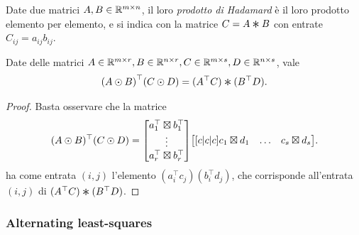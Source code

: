 \begin{definition}
	Date due matrici $ A,B \in \mathbb{R}^{m\times n} $, il loro \emph{prodotto di Hadamard} è il loro
	prodotto elemento per elemento, e si indica con la matrice $ C = A \had B $ con entrate $ C_{ij} =
		a_{ij}b_{ij} $.
\end{definition}
\begin{lemma}
	\label{lhm:had_krp}
	Date delle matrici $ A \in \mathbb{R}^{m\times r}, B \in \mathbb{R}^{n \times r}, C \in \mathbb{R}^{m\times s}, D \in
		\mathbb{R}^{n\times s} $, vale
	\begin{equation*}
		\left( A \krp B \right)^{\top} \left( C \krp D \right) = (
		A^{\top}C ) \had ( B^{\top}D ).
	\end{equation*}
\end{lemma}
\begin{proof}
	Basta osservare che la matrice
	\begin{equation*}
		\begin{aligned}
			(A \krp B)^{\top}(C \krp D) =
			\begin{bmatrix} a_1^{\top} \krn b_1^{\top} \\ \vdots \\
				a_{r}^{\top} \krn b_{r}^{\top}
			\end{bmatrix} \begin{bmatrix}[c|c|c]
				              c_1 \krn d_{1} & \dots & c_{s} \krn d_{s}
			              \end{bmatrix}.
		\end{aligned}
	\end{equation*}
	ha come entrata $ (i,j) $ l'elemento $ (a_{i}^{\top}c_{j})(b_{i}^{\top}d_{j}) $, che corrisponde
	all'entrata $ (i,j) $ di $ (A^{\top}C ) \had ( B^{\top}D ) $.
\end{proof}



\subsubsection{Alternating least-squares}

